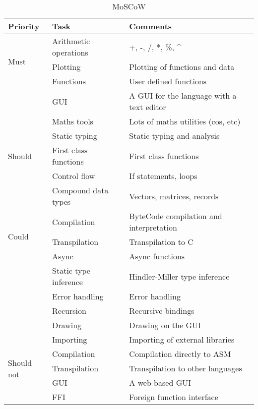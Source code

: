 \documentclass[a4paper, oneside, 11pt]{report}
\begin{document}
\begin{table}[h]
    \caption{MoSCoW}
    \begin{center}
        \begin{tabular}{|p{1in}|p{2in}|p{2.5in}|} \hline
        Priority & Task & Comments \\ \hline \hline
        \multirow{3}{1in}{Must}
        & Arithmetic operations & +, -, /, *, \%, ^ \\ \cline{2-3}
        & Plotting & Plotting of functions and data \\ \cline{2-3}
        & Functions & User defined functions \\ \cline{2-3}
        & GUI & A GUI for the language with a text editor \\ \cline{2-3}
        & Maths tools & Lots of maths utilities (cos, etc) \\ \cline{2-3}
        \multirow{3}{1in}{Should}
        & Static typing & Static typing and analysis \\ \cline{2-3}
        & First class functions & First class functions \\ \cline{2-3}
        & Control flow & If statements, loops \\ \cline{2-3}
        & Compound data types & Vectors, matrices, records \\ \cline{2-3}
        \multirow{3}{1in}{Could}
        & Compilation & ByteCode compilation and interpretation \\ \cline{2-3}
        & Transpilation & Transpilation to C \\ \cline{2-3}
        & Async & Async functions \\ \cline{2-3}
        & Static type inference & Hindler-Miller type inference \\ \cline{2-3}
        & Error handling & Error handling \\ \cline{2-3}
        & Recursion & Recursive bindings \\ \cline{2-3}
        & Drawing & Drawing on the GUI \\ \cline{2-3}
        & Importing & Importing of external libraries \\ \cline{2-3}
        \multirow{3}{1in}{Should not}
        & Compilation & Compilation directly to ASM \\ \cline{2-3}
        & Transpilation & Transpilation to other languages \\ \cline{2-3}
        & GUI & A web-based GUI \\ \cline{2-3}
        & FFI & Foreign function interface \\ \cline{2-3}
        \end{tabular}
        \label{Table1}
    \end{center}
\end{table}
\end{document}
